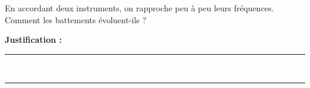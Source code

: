 En accordant deux instruments, on rapproche peu à peu leurs fréquences. Comment les battements évoluent-ils ?

\choices

\noindent\textbf{Justification :} \hrulefill \\[2.5ex]
\rule{\linewidth}{0.4pt} \\[2.5ex]
\rule{\linewidth}{0.4pt}
\vfill
